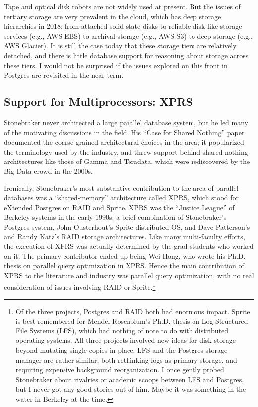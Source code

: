 \documentclass[sigconf,natbib=false]{acmart}
\begin{document}
Tape and optical disk robots are not widely used at present. But the issues of tertiary storage are very prevalent in the cloud, which has deep storage hierarchies in 2018: from attached solid-state disks to reliable disk-like storage services (e.g., AWS EBS) to archival storage (e.g., AWS S3) to deep storage (e.g., AWS Glacier). It is still the case today that these storage tiers are relatively detached, and there is little database support for reasoning about storage across these tiers. I would not be surprised if the issues explored on this front in Postgres are revisited in the near term.

\subsection{Support for Multiprocessors: XPRS}

Stonebraker never architected a large parallel database system, but he led many of the motivating discussions in the field. His ``Case for Shared Nothing'' paper~\cite{stonebraker1986case} documented the coarse-grained architectural choices in the area; it popularized the terminology used by the industry, and threw support behind shared-nothing architectures like those of Gamma and Teradata, which were rediscovered by the Big Data crowd in the 2000s.

Ironically, Stonebraker's most substantive contribution to the area of parallel databases was a ``shared-memory'' architecture called XPRS, which stood for eXtended Postgres on RAID and Sprite. XPRS was the ``Justice League'' of Berkeley systems in the early 1990s: a brief combination of Stonebraker's Postgres system, John Ousterhout's Sprite distributed OS, and Dave Patterson's and Randy Katz's RAID storage architectures. Like many multi-faculty efforts, the execution of XPRS was actually determined by the grad students who worked on it. The primary contributor ended up being Wei Hong, who wrote his Ph.D. thesis on parallel query optimization in XPRS. Hence the main contribution of XPRS to the literature and industry was parallel query optimization, with no real consideration of issues involving RAID or Sprite.\footnote{Of the three projects, Postgres and RAID both had enormous impact. Sprite is best remembered for Mendel Rosenblum's Ph.D. thesis on Log Structured File Systems (LFS), which had nothing of note to do with distributed operating systems. All three projects involved new ideas for disk storage beyond mutating single copies in place. LFS and the Postgres storage manager are rather similar, both rethinking logs as primary storage, and requiring expensive background reorganization. I once gently probed Stonebraker about rivalries or academic scoops between LFS and Postgres, but I never got any good stories out of him. Maybe it was something in the water in Berkeley at the time.}
\end{document}
